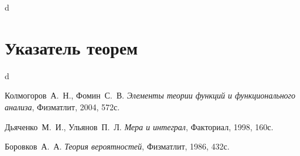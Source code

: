 \documentclass[12pt]{article}
\numberwithin{theorem}{section}
\theoremstyle{definition}
\begin{document}
	d
	
	\section{Указатель теорем}
	
	d
	
	\begin{thebibliography}{2}
		
		 Колмогоров~А.~Н., Фомин~С.~В. {\it Элементы теории функций и функционального анализа}, Физматлит, 2004, 572с.
		
		 Дьяченко~М.~И., Ульянов~П.~Л. {\it Мера и интеграл}, Факториал, 1998, 160с.
	
		 Боровков~А.~А. {\it Теория вероятностей}, Физматлит, 1986, 432с.
	
	\end{thebibliography}
	
	
\end{document}
